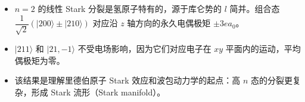 \begin{insightbox}[物理图像]
\begin{itemize}
    \item $n=2$ 的线性 Stark 分裂是氢原子特有的，源于库仑势的 $l$ 简并。组合态 $\dfrac{1}{\sqrt2}(|200\rangle\pm|210\rangle)$ 对应沿 $z$ 轴方向的永久电偶极矩 $\pm3ea_0$。
    \item $|211\rangle$ 和 $|21,-1\rangle$ 不受电场影响，因为它们对应电子在 $xy$ 平面内的运动，平均偶极矩为零。
    \item 该结果是理解里德伯原子 Stark 效应和波包动力学的起点：高 $n$ 态的分裂更复杂，形成 Stark 流形（Stark manifold）。
\end{itemize}
\end{insightbox}

